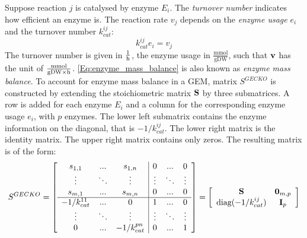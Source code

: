 \newpage
Suppose reaction $j$ is catalysed by enzyme $E_i$. The \textit{turnover number} indicates how efficient an enzyme is. The reaction rate $v_j$ depends on the \textit{enzyme usage} $e_i$ and the turnover number $k_{cat}^{ij}$: 
\begin{equation} \label{Eq:enzyme_mass_balance}
    k_{cat}^{ij} e_i = v_j   
\end{equation}
The turnover number is given in $\frac{1}{\text h}$, the enzyme usage in $\frac{\text{mmol}}{\text{gDW}}$, such that $\bold v$ has the unit of $\frac{\text{mmol}}{\text{gDW} \times \text h}$. 
\cref{Eq:enzyme_mass_balance} is also known as \textit{enzyme mass balance}.
To account for enzyme mass balance in a GEM, matrix $S^{GECKO}$ is constructed by extending the stoichiometric matrix $\bold S$ by three submatrices. 
A row is added for each enzyme $E_i$ and a column for the corresponding enzyme usage $e_i$, with $p$ enzymes. The lower left submatrix contains the enzyme information on the diagonal, that is $-1/k_{cat}^{ij}$. The lower right matrix is the identity matrix. The upper right matrix contains only zeros.
The resulting matrix is of the form:
\begin{equation*}
    S^{GECKO} = \left[\begin{array}{ccc|ccc} 
        s_{1,1} & \text{...} & s_{1,n} & 0 & \text{...} & 0 \\ 
        \vdots & \ddots & \vdots & \vdots & \ddots & \vdots \\
        s_{m,1} & \text{...} & s_{m,n} & 0 & \text{...} & 0 \\
        \hline 
        -1/k_{cat}^{11} & \text{...} & 0 & 1 & \text{...} & 0 \\ 
        \vdots & \ddots & \vdots & \vdots & \ddots & \vdots \\
        0 & \text{...} & -1/k_{cat}^{pn} & 0 & \text{...} & 1
    \end{array}\right] = 
    \left[\begin{array}{cc} 
        \bold S & \bold 0_{m,p} \\
        \text{diag} (-1/k_{cat}^{ij}) & \bold I_p
    \end{array}\right]
\end{equation*}

